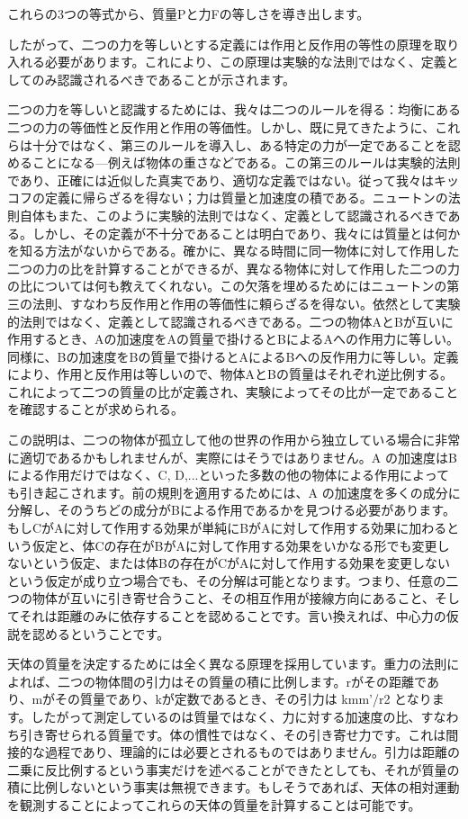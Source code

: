 \documentclass[a4paper,11pt,openany]{ltjsbook}
\begin{document}
これらの3つの等式から、質量Pと力Fの等しさを導き出します。

したがって、二つの力を等しいとする定義には作用と反作用の等性の原理を取り入れる必要があります。これにより、この原理は実験的な法則ではなく、定義としてのみ認識されるべきであることが示されます。

二つの力を等しいと認識するためには、我々は二つのルールを得る：均衡にある二つの力の等価性と反作用と作用の等価性。しかし、既に見てきたように、これらは十分ではなく、第三のルールを導入し、ある特定の力が一定であることを認めることになる—例えば物体の重さなどである。この第三のルールは実験的法則であり、正確には近似した真実であり、適切な定義ではない。従って我々はキッコフの定義に帰らざるを得ない；力は質量と加速度の積である。ニュートンの法則自体もまた、このように実験的法則ではなく、定義として認識されるべきである。しかし、その定義が不十分であることは明白であり、我々には質量とは何かを知る方法がないからである。確かに、異なる時間に同一物体に対して作用した二つの力の比を計算することができるが、異なる物体に対して作用した二つの力の比については何も教えてくれない。この欠落を埋めるためにはニュートンの第三の法則、すなわち反作用と作用の等価性に頼らざるを得ない。依然として実験的法則ではなく、定義として認識されるべきである。二つの物体AとBが互いに作用するとき、Aの加速度をAの質量で掛けるとBによるAへの作用力に等しい。同様に、Bの加速度をBの質量で掛けるとAによるBへの反作用力に等しい。定義により、作用と反作用は等しいので、物体AとBの質量はそれぞれ逆比例する。これによって二つの質量の比が定義され、実験によってその比が一定であることを確認することが求められる。


この説明は、二つの物体が孤立して他の世界の作用から独立している場合に非常に適切であるかもしれませんが、実際にはそうではありません。A の加速度はBによる作用だけではなく、C, D,...といった多数の他の物体による作用によっても引き起こされます。前の規則を適用するためには、A の加速度を多くの成分に分解し、そのうちどの成分がBによる作用であるかを見つける必要があります。もしCがAに対して作用する効果が単純にBがAに対して作用する効果に加わるという仮定と、体Cの存在がBがAに対して作用する効果をいかなる形でも変更しないという仮定、または体Bの存在がCがAに対して作用する効果を変更しないという仮定が成り立つ場合でも、その分解は可能となります。つまり、任意の二つの物体が互いに引き寄せ合うこと、その相互作用が接線方向にあること、そしてそれは距離のみに依存することを認めることです。言い換えれば、中心力の仮説を認めるということです。

天体の質量を決定するためには全く異なる原理を採用しています。重力の法則によれば、二つの物体間の引力はその質量の積に比例します。rがその距離であり、mがその質量であり、kが定数であるとき、その引力は kmm'/r2 となります。したがって測定しているのは質量ではなく、力に対する加速度の比、すなわち引き寄せられる質量です。体の慣性ではなく、その引き寄せ力です。これは間接的な過程であり、理論的には必要とされるものではありません。引力は距離の二乗に反比例するという事実だけを述べることができたとしても、それが質量の積に比例しないという事実は無視できます。もしそうであれば、天体の相対運動を観測することによってこれらの天体の質量を計算することは可能です。
\end{document}

